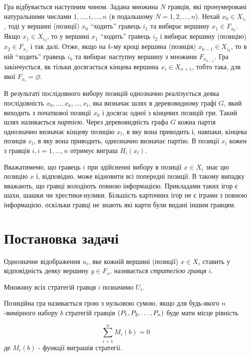 \documentclass[12pt,a4paper]{article}
\begin{document}
Гра відбувається наступним чином. Задана множина $N$ гравців, які
пронумеровані натуральними числами $1,\dots,i,\dots,n$ (в подальшому
$N={1,2,\dots,n}$). Нехай $x_0 \in X_{i_1}$, тоді у вершині (позиції) $x_0$
``ходить'' гравець $i_1$ та вибирає вершину $x_1 \in F_{x_0}$. Якщо $x_1 \in
X_{i_2}$, то у вершині $x_1$ ``ходить'' гравець $i_2$ і вибирає вершину
(позицію) $x_2 \in F_{x_1}$ і так далі. Отже, якщо на $k$-му кроці вершина
(позиція) $x_{k-1} \in X_{i_k}$, то в ній ``ходить'' гравець $i_k$ та вибирає
наступну вершину з множини $F_{x_{k-1}}$. Гра закінчується, як тільки
досягається кінцева вершина $x_i \in X_{n+1}$, тобто така, для якої
$F_{x_i}=\varnothing$.

В результаті послідовного вибору позицій однозначно реалізується деяка
послідовність $x_0,\dots,x_k,\dots,x_l$, яка визначає шлях в деревовидному
графі $G$, який виходить з початкової позиції $x_0$ і досягає одної з кінцевих
позицій гри. Такий шлях називається \textit{партією}. Через деревовидність
графа $G$ кожна партія однозначно визначає кінцеву позицію $x_l$, в яку вона
приводить і, навпаки, кінцева позиція $x_l$, в яку вона приводить, однозначно
визначає партію. В позиції $x_l$ кожен з гравців $i, i=1,\dots,n$ отримує
виграш $H_i(x_l)$.

Вважатимемо, що гравець $i$ при здійсненні вибору в позиції $x \in X_i$ знає
цю позицію $x$ і, відповідно, може відновити всі попередні позиції. В такому
випадку вважають, що гравці володіють повною інформацією. Прикладами таких
ігор є шахи, шашки чи хрестики-нулики. Більшість карточних ігор не є іграми з
повною інформацією, оскільки гравці не знають які карти були видані іншим
гравцям.

\section{Постановка задачі}

Однозначне відображення $u_i$, яке кожній вершині (позиції) $x \in X_i$
ставить у відповідність деяку вершину $y \in F_x$, називається
\textit{стратегією гравця} $i$.

Множину всіх стратегій гравця $i$ позначимо $U_i$.

Позиційна гра називається грою з нульовою сумою, якщо для будь-якого
$n$-вимірного набору $b$ стратегій гравців $(P_1,P_2,\dots,P_n)$ буде мати місце рівність

\begin{equation*}
  \sum\limits_{i=1}^{n}{M_i(b)}=0
\end{equation*}
де $M_i(b)$ - функції виграшів стратегії.
\end{document}
